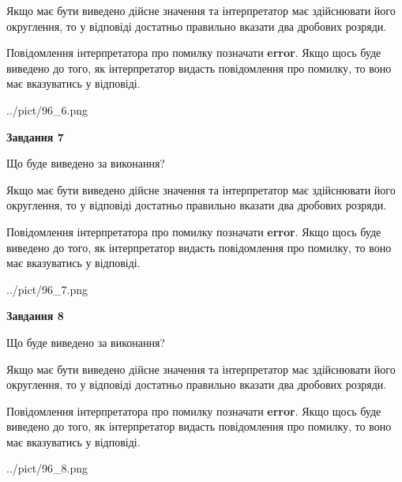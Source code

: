\documentclass[12pt, ukrainian]{article}
\begin{document}
{\begin {Large}
Якщо має бути виведено дійсне значення та інтерпретатор має здійснювати його округлення, 
то у відповіді достатньо правильно вказати два дробових розряди.

Повідомлення інтерпретатора про помилку позначати \textbf{error}.
Якщо щось буде виведено до того, як інтерпретатор видасть повідомлення про помилку, 
то воно має вказуватись у відповіді. \par

\begin{center}
	{../pict/96_6.png}
\end{center}
\newpage

{\begin {center}\textbf{Завдання 7}\end {center}}\par
Що буде виведено за виконання? \par

Якщо має бути виведено дійсне значення та інтерпретатор має здійснювати його округлення, 
то у відповіді достатньо правильно вказати два дробових розряди.

Повідомлення інтерпретатора про помилку позначати \textbf{error}.
Якщо щось буде виведено до того, як інтерпретатор видасть повідомлення про помилку, 
то воно має вказуватись у відповіді. \par

\begin{center}
	{../pict/96_7.png}
\end{center}
\newpage

{\begin {center}\textbf{Завдання 8}\end {center}}\par
Що буде виведено за виконання? \par

Якщо має бути виведено дійсне значення та інтерпретатор має здійснювати його округлення, 
то у відповіді достатньо правильно вказати два дробових розряди.

Повідомлення інтерпретатора про помилку позначати \textbf{error}.
Якщо щось буде виведено до того, як інтерпретатор видасть повідомлення про помилку, 
то воно має вказуватись у відповіді. \par

\begin{center}
	{../pict/96_8.png}
\end{center}
\newpage


\end{Large}}
\end{document}
